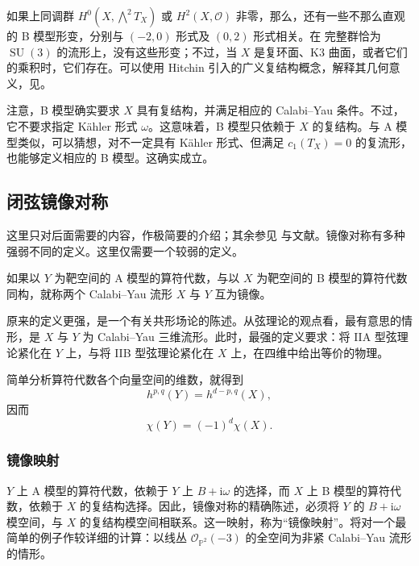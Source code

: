 如果上同调群 $H^0(X,\bigwedge^2T_X)$ 或 $H^2(X,\mathcal{O})$ 非零，那么，还有一些不那么直观的 B 模型形变，分别与 $(-2,0)$ 形式及 $(0,2)$ 形式相关。在 完整群恰为 $\operatorname{SU}(3)$ 的流形上，没有这些形变；不过，当 $X$ 是复环面、K3 曲面，或者它们的乘积时，它们存在。可以使用 Hitchin 引入的广义复结构概念，解释其几何意义，见。

注意，B 模型确实要求 $X$ 具有复结构，并满足相应的 Calabi--Yau 条件。不过，它不要求指定 K\"ahler 形式 $\omega$。这意味着，B 模型只依赖于 $X$ 的复结构。与 A 模型类似，可以猜想，对不一定具有 K\"ahler 形式、但满足 $c_1(T_X)=0$ 的复流形，也能够定义相应的 B 模型。这确实成立。

\subsection{闭弦镜像对称}\label{sec:3.4.3}

这里只对后面需要的内容，作极简要的介绍；其余参见  与文献。镜像对称有多种强弱不同的定义。这里仅需要一个较弱的定义。
\begin{definition*}\label{def:3.closed-string-mirror}
如果以 $Y$ 为靶空间的 A 模型的算符代数，与以 $X$ 为靶空间的 B 模型的算符代数同构，就称两个 Calabi--Yau 流形 $X$ 与 $Y$ 互为镜像。
\end{definition*}

原来的定义更强，是一个有关共形场论的陈述。从弦理论的观点看，最有意思的情形，是 $X$ 与 $Y$ 为 Calabi--Yau 三维流形。此时，最强的定义要求：将 IIA 型弦理论紧化在 $Y$ 上，与将 IIB 型弦理论紧化在 $X$ 上，在四维中给出等价的物理。

简单分析算符代数各个向量空间的维数，就得到
\[
h^{p,q}(Y)=h^{d-p,q}(X),
\]
因而
\[
\chi(Y)=(-1)^d\chi(X).
\]

\subsubsection{镜像映射}\label{sec:3.4.3.1}

$Y$ 上 A 模型的算符代数，依赖于 $Y$ 上 $B+\mathrm{i}\omega$ 的选择，而 $X$ 上 B 模型的算符代数，依赖于 $X$ 的复结构选择。因此，镜像对称的精确陈述，必须将 $Y$ 的 $B+\mathrm{i}\omega$ 模空间，与 $X$ 的复结构模空间相联系。这一映射，称为“镜像映射”。将对一个最简单的例子作较详细的计算：以线丛 $\mathcal{O}_{\mathbb{P}^2}(-3)$ 的全空间为非紧 Calabi--Yau 流形的情形。


